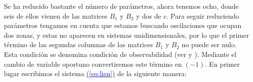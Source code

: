 \documentclass[12pt,a4paper]{report} %
\newcommand{\eref}[1]{\hyperref[#1]{\textcolor{blue}{(\ref*{#1})}}}
\begin{document}
\newpage

	\vspace{0.5cm}Se ha reducido bastante el número de parámetros, ahora tenemos ocho, donde seis de ellos vienen de las matrices $B_1$ y $B_2$ y dos de $c$. Para seguir reduciendo parámetros tengamos en cuenta que estamos buscando oscilaciones que ocupan dos zonas, y estas no aparecen en sistemas unidimensionales, por lo que el primer término de las segundas columnas de las matrices $B_1$ y $B_2$ no puede ser nulo. Esta condición se denomina condición de observabilidad (ver \cite{onsimplyfing} y \cite{docvic}). Mediante el cambio de variable oportuno convertiremos este término en $(-1)$. En primer lugar escribimos el sistema \eref{eq:lien} de la siguiente manera:
	
\end{document}
